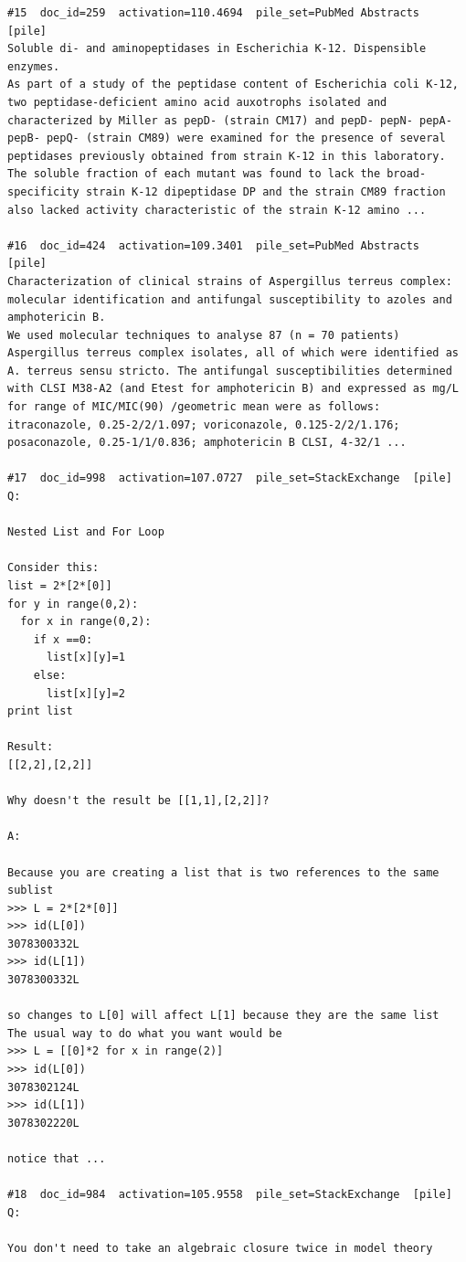 \begin{verbatim}
#15  doc_id=259  activation=110.4694  pile_set=PubMed Abstracts  [pile]
Soluble di- and aminopeptidases in Escherichia K-12. Dispensible enzymes.
As part of a study of the peptidase content of Escherichia coli K-12, two peptidase-deficient amino acid auxotrophs isolated and characterized by Miller as pepD- (strain CM17) and pepD- pepN- pepA- pepB- pepQ- (strain CM89) were examined for the presence of several peptidases previously obtained from strain K-12 in this laboratory. The soluble fraction of each mutant was found to lack the broad-specificity strain K-12 dipeptidase DP and the strain CM89 fraction also lacked activity characteristic of the strain K-12 amino ...

#16  doc_id=424  activation=109.3401  pile_set=PubMed Abstracts  [pile]
Characterization of clinical strains of Aspergillus terreus complex: molecular identification and antifungal susceptibility to azoles and amphotericin B.
We used molecular techniques to analyse 87 (n = 70 patients) Aspergillus terreus complex isolates, all of which were identified as A. terreus sensu stricto. The antifungal susceptibilities determined with CLSI M38-A2 (and Etest for amphotericin B) and expressed as mg/L for range of MIC/MIC(90) /geometric mean were as follows: itraconazole, 0.25-2/2/1.097; voriconazole, 0.125-2/2/1.176; posaconazole, 0.25-1/1/0.836; amphotericin B CLSI, 4-32/1 ...

#17  doc_id=998  activation=107.0727  pile_set=StackExchange  [pile]
Q:

Nested List and For Loop

Consider this:
list = 2*[2*[0]]
for y in range(0,2):
  for x in range(0,2):
    if x ==0:
      list[x][y]=1
    else:
      list[x][y]=2
print list

Result:
[[2,2],[2,2]]

Why doesn't the result be [[1,1],[2,2]]?

A:

Because you are creating a list that is two references to the same sublist
>>> L = 2*[2*[0]]
>>> id(L[0])
3078300332L
>>> id(L[1])
3078300332L

so changes to L[0] will affect L[1] because they are the same list
The usual way to do what you want would be
>>> L = [[0]*2 for x in range(2)]
>>> id(L[0])
3078302124L
>>> id(L[1])
3078302220L

notice that ...

#18  doc_id=984  activation=105.9558  pile_set=StackExchange  [pile]
Q:

You don't need to take an algebraic closure twice in model theory


\end{verbatim}

